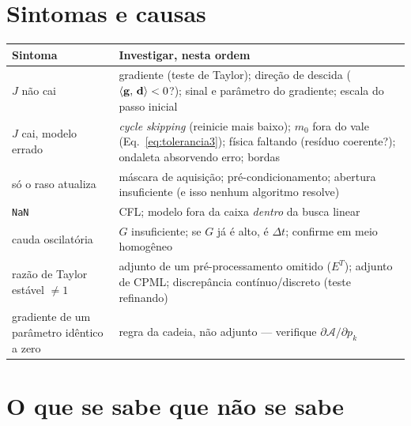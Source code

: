 \documentclass[11pt,a4paper,oneside]{report}
\begin{document}
\section{Sintomas e causas}

\begin{center}
\begin{tabular}{@{}p{3.6cm}p{11.2cm}@{}}
\toprule
\textbf{Sintoma} & \textbf{Investigar, nesta ordem} \\
\midrule
$J$ n\~ao cai & gradiente (teste de Taylor); dire\c{c}\~ao de descida
  ($\langle \mathbf{g},\,\mathbf{d}\rangle<0$?); sinal e par\^ametro do gradiente;
  escala do passo inicial \\
$J$ cai, modelo errado & \emph{cycle skipping} (reinicie mais baixo);
  $m_0$ fora do vale (Eq.~\ref{eq:tolerancia3}); f\'isica faltando (res\'iduo
  coerente?); ondaleta absorvendo erro; bordas \\
s\'o o raso atualiza & m\'ascara de aquisi\c{c}\~ao; pr\'e-condicionamento;
  abertura insuficiente (e isso nenhum algoritmo resolve) \\
\texttt{NaN} & CFL; modelo fora da caixa \emph{dentro} da busca linear \\
cauda oscilat\'oria & $G$ insuficiente; se $G$ j\'a \'e alto, \'e $\Delta t$;
  confirme em meio homog\^eneo \\
raz\~ao de Taylor est\'avel $\ne 1$ & adjunto de um pr\'e-processamento omitido
  ($E^{T}$); adjunto de CPML; discrep\^ancia cont\'inuo/discreto
  (teste refinando) \\
gradiente de um par\^ametro id\^entico a zero & regra da cadeia, n\~ao
  adjunto --- verifique $\partial\mathcal{A}/\partial p_k$ \\
\bottomrule
\end{tabular}
\end{center}

\section{O que se sabe que n\~ao se sabe}
\end{document}
